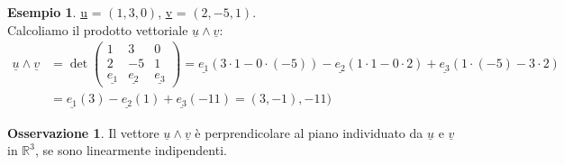 \documentclass[a4paper]{article}
\theoremstyle{definition}
\newtheorem*{oss}{Osservazione}
\newtheorem*{es}{Esempio}
\begin{document}
\begin{es}
	\underline{u} = $(1, 3, 0)$, \underline{v} = $(2, -5, 1)$. \\
Calcoliamo il prodotto vettoriale $\underline{u} \wedge \underline{v}$:
\begin{align*}
	\underline{u} \wedge \underline{v} & = \det \begin{pmatrix}
		1 & 3 & 0 \\
		2 & -5 & 1 \\
		\underline{e_1} & \underline{e_2} & \underline{e_3}
	\end{pmatrix} = \underline{e_1}(3 \cdot 1 - 0 \cdot ( -5)) - \underline{e_2}(1 \cdot 1 - 0 \cdot 2) + \underline{e_3}(1 \cdot ( -5) - 3 \cdot 2) \\
	          & = \underline{e_1}(3) - \underline{e_2}(1) + \underline{e_3}(-11) = (3, - 1), -11)
\end{align*}
\end{es}

\begin{oss}
	Il vettore $\underline{u} \wedge \underline{v}$ è perprendicolare al piano individuato da $\underline{u}$ e $\underline{v}$ in $\mathbb{R}^3$,
	se sono linearmente indipendenti.
\end{oss}
\end{document}
